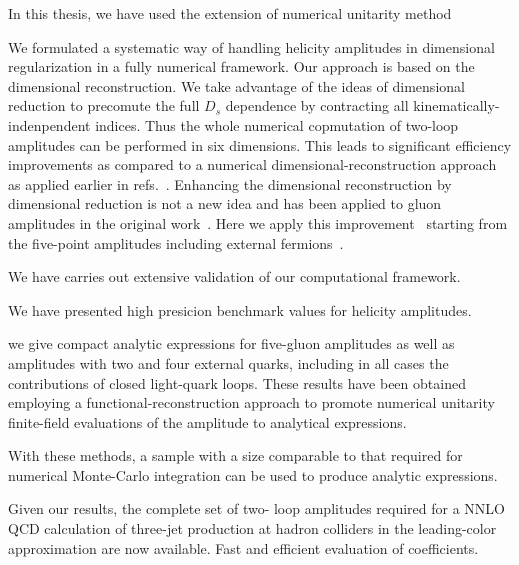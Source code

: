 In this thesis, we have used the extension of numerical unitarity method  



We formulated a systematic way of handling helicity amplitudes in dimensional regularization in a fully numerical framework.
Our approach is based on the dimensional reconstruction. We take advantage of the ideas of dimensional reduction
to precomute the full $D_s$ dependence by contracting all kinematically-indenpendent indices.
Thus the whole numerical copmutation  of two-loop amplitudes can be performed in six dimensions.
This leads to
significant efficiency improvements as compared to a numerical dimensional-reconstruction
approach~\cite{Giele:2008ve,Ellis:2008ir, Boughezal:2011br} as applied earlier
in refs.~\cite{Abreu:2017xsl,Abreu:2017hqn,Badger:2018gip,Abreu:2018jgq}.
Enhancing the dimensional reconstruction by dimensional reduction 
is not a new idea and has been applied to gluon amplitudes in
the original work~\cite{Giele:2008ve}.
Here we apply this improvement~\cite{Anger:2018ove}
starting from the five-point amplitudes including external fermions~\cite{Abreu:2018jgq}.  


We have carries out extensive validation of our computational framework.

We have presented high presicion benchmark values for helicity amplitudes.

 we give compact
analytic expressions for five-gluon amplitudes as well as amplitudes with two and four
external quarks, including in all cases the contributions of closed light-quark loops.
These
results have been obtained employing a functional-reconstruction approach to promote
numerical unitarity  finite-field evaluations of the amplitude to analytical expressions.

With these methods, a sample with a size comparable to that required for
numerical Monte-Carlo integration
can be used to produce analytic expressions.

 Given our results, the complete set of two-
 loop amplitudes required for a NNLO QCD calculation of three-jet production at hadron
 colliders in the leading-color approximation are now available.
 Fast and efficient evaluation of coefficients.



